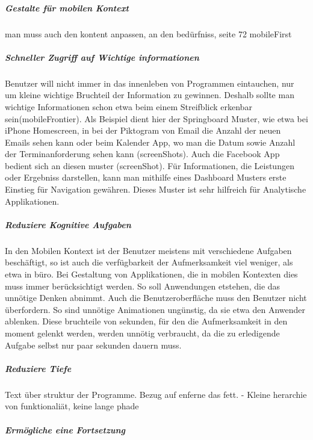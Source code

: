 \subparagraph{Gestalte für mobilen Kontext} %
\label{subp:gestalte_f_r_mobilen_kontext}

man muss auch den kontent anpassen, an den bedürfniss, seite 72 mobileFirst


\subparagraph{Schneller Zugriff auf Wichtige informationen} %
\label{subp:subparagraph_name}

Benutzer will nicht immer in das innenleben von Programmen eintauchen, nur um kleine wichtige Bruchteil der Information zu gewinnen. Deshalb sollte man wichtige Informationen schon etwa beim einem Streifblick erkenbar sein(mobileFrontier)\cite{Neil:2012uf}. Als Beispiel dient hier der Springboard Muster, wie etwa bei iPhone Homescreen, in bei der Piktogram von Email die Anzahl der neuen Emails sehen kann oder beim Kalender App, wo man die Datum sowie Anzahl der Terminanforderung sehen kann (screenShots). Auch die Facebook App bedient sich an diesen muster (screenShot). Für Informationen, die Leistungen oder Ergebniss darstellen, kann man mithilfe eines Dashboard Musters erste Einstieg für Navigation gewähren. Dieses Muster ist sehr hilfreich für Analytische Applikationen.

\subparagraph{Reduziere Kognitive Aufgaben } %
\label{subp:reduziere_kognitive_aufgaben_}

In den Mobilen Kontext ist der Benutzer meistens mit verschiedene Aufgaben beschäftigt, so ist auch die verfügbarkeit der Aufmerksamkeit viel weniger, als etwa in büro. Bei Gestaltung von Applikationen, die in mobilen Kontexten dies muss immer berücksichtigt werden. So soll Anwendungen etstehen, die das unnötige Denken abnimmt. Auch die Benutzeroberfläche muss den Benutzer nicht überfordern. So sind unnötige Animationen ungünstig, da sie etwa den Anwender ablenken. Diese bruchteile von sekunden, für den die Aufmerksamkeit in den moment gelenkt werden, werden unnötig verbraucht, da die zu erledigende Aufgabe selbst nur paar sekunden dauern muss.



\subparagraph{Reduziere Tiefe} %
\label{subp:reduziere_das_w_hlen}


Text über struktur der Programme. Bezug auf enferne das fett.
- Kleine herarchie von funktionaliät, keine lange phade

\subparagraph{Ermögliche eine Fortsetzung} %
\label{subp:erm_gliche_eine_fortsetzung}

